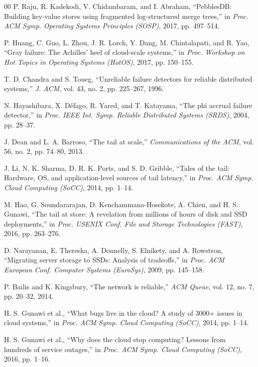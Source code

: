 \documentclass[conference, a4paper]{IEEEtran}
\begin{document}
\begin{thebibliography}{00}
P. Raju, R. Kadekodi, V. Chidambaram, and I. Abraham, ``PebblesDB:
Building key-value stores using fragmented log-structured merge trees,''
in \textit{Proc. ACM Symp. Operating Systems Principles (SOSP)}, 2017,
pp. 497--514.

P. Huang, C. Guo, L. Zhou, J. R. Lorch, Y. Dang, M. Chintalapati, and
R. Yao, ``Gray failure: The Achilles' heel of cloud-scale systems,'' in
\textit{Proc. Workshop on Hot Topics in Operating Systems (HotOS)},
2017, pp. 150--155.

T. D. Chandra and S. Toueg, ``Unreliable failure detectors for reliable
distributed systems,'' \textit{J. ACM}, vol. 43, no. 2, pp. 225--267,
1996.

N. Hayashibara, X. D\'efago, R. Yared, and T. Katayama, ``The phi accrual
failure detector,'' in \textit{Proc. IEEE Int. Symp. Reliable Distributed
Systems (SRDS)}, 2004, pp. 28--37.

J. Dean and L. A. Barroso, ``The tail at scale,'' \textit{Communications
of the ACM}, vol. 56, no. 2, pp. 74--80, 2013.

J. Li, N. K. Sharma, D. R. K. Ports, and S. D. Gribble, ``Tales of the
tail: Hardware, OS, and application-level sources of tail latency,'' in
\textit{Proc. ACM Symp. Cloud Computing (SoCC)}, 2014, pp. 1--14.

M. Hao, G. Soundararajan, D. Kenchammana-Hosekote, A. Chien, and
H. S. Gunawi, ``The tail at store: A revelation from millions of hours
of disk and SSD deployments,'' in \textit{Proc. USENIX Conf. File and
Storage Technologies (FAST)}, 2016, pp. 263--276.

D. Narayanan, E. Thereska, A. Donnelly, S. Elnikety, and A. Rowstron,
``Migrating server storage to SSDs: Analysis of tradeoffs,'' in
\textit{Proc. ACM European Conf. Computer Systems (EuroSys)}, 2009,
pp. 145--158.

P. Bailis and K. Kingsbury, ``The network is reliable,'' \textit{ACM
Queue}, vol. 12, no. 7, pp. 20--32, 2014.

H. S. Gunawi et al., ``What bugs live in the cloud? A study of 3000+
issues in cloud systems,'' in \textit{Proc. ACM Symp. Cloud Computing
(SoCC)}, 2014, pp. 1--14.

H. S. Gunawi et al., ``Why does the cloud stop computing? Lessons from
hundreds of service outages,'' in \textit{Proc. ACM Symp. Cloud
Computing (SoCC)}, 2016, pp. 1--16.


\end{thebibliography}
\end{document}
